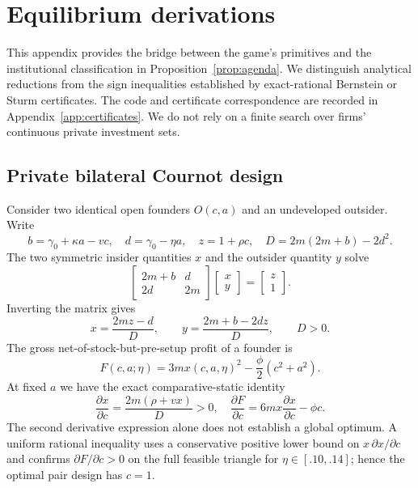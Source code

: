\section{Equilibrium derivations}\label{app:proofs}

This appendix provides the bridge between the game's primitives and the institutional classification in Proposition~\ref{prop:agenda}. We distinguish analytical reductions from the sign inequalities established by exact-rational Bernstein or Sturm certificates. The code and certificate correspondence are recorded in Appendix~\ref{app:certificates}. We do not rely on a finite search over firms' continuous private investment sets.

\subsection{Private bilateral Cournot design}\label{app:bilateral}

Consider two identical open founders \(O(c,a)\) and an undeveloped outsider. Write
\[
 b=\gamma_0+\kappa a-vc,\quad d=\gamma_0-\eta a,
 \quad z=1+\rho c,\quad D=2m(2m+b)-2d^2.
\]
The two symmetric insider quantities \(x\) and the outsider quantity \(y\) solve
\[
 \begin{bmatrix}2m+b&d\\ 2d&2m\end{bmatrix}
 \begin{bmatrix}x\\y\end{bmatrix}
 =
 \begin{bmatrix}z\\1\end{bmatrix}.
\]
Inverting the matrix gives
\begin{equation}
 x=\frac{2mz-d}{D},\qquad
 y=\frac{2m+b-2dz}{D},\qquad D>0.
 \label{eq:app-xy}
\end{equation}
The gross net-of-stock-but-pre-setup profit of a founder is
\[
 F(c,a;\eta)=3m x(c,a,\eta)^2-\frac{\phi}{2}(c^2+a^2).
\]
At fixed \(a\) we have the exact comparative-static identity
\[
 \frac{\partial x}{\partial c}
 =\frac{2m(\rho+vx)}{D}>0,
\quad
 \frac{\partial F}{\partial c}
 =6m x\frac{\partial x}{\partial c}-\phi c.
\]
The second derivative expression alone does not establish a global optimum. A uniform rational inequality uses a conservative positive lower bound on \(x\,\partial x/\partial c\) and confirms \(\partial F/\partial c>0\) on the full feasible triangle for \(\eta\in[.10,.14]\); hence the optimal pair design has \(c=1\).

